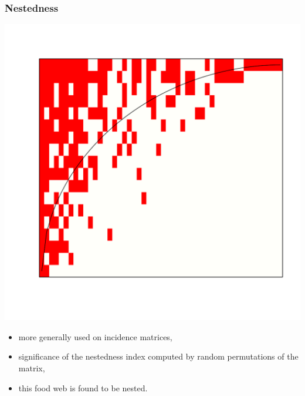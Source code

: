 \documentclass[nopagenumber,9pt]{beamer}
\begin{document}
\begin{frame}
 \frametitle{Nestedness}
 
 \begin{center}
  \includegraphics[scale=.3]{plots/chilean_nested.pdf}
 \end{center}


 \begin{itemize}
  \item more generally used on incidence matrices,
  \item significance of the nestedness index computed by random permutations of the matrix,
  \item this food web is found to be nested.
 
 \end{itemize}

 \end{frame}
\end{document}
